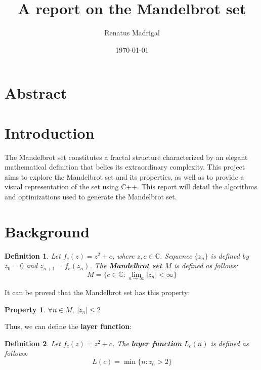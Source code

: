 \documentclass[11pt]{article}
\title{A report on the Mandelbrot set}
\author{Renatus Madrigal}
\date{\today}
\newtheorem{definition}{Definition}
\newtheorem{property}{Property}
\begin{document}
    \maketitle


    \section{Abstract}\label{sec:abstract}


    \section{Introduction}\label{sec:introduction}

    The Mandelbrot set constitutes a fractal structure characterized by an elegant mathematical definition that belies
    its extraordinary complexity.
    This project aims to explore the Mandelbrot set and its properties, as well as to provide a visual representation of
    the set using C++.
    This report will detail the algorithms and optimizations used to generate the Mandelbrot set.


    \section{Background}\label{sec:background}

    \begin{definition}
        Let $f_c(z) = z^2 + c$, where $z, c \in \mathbb{C}$.
        Sequence $\{z_n\}$ is defined by $z_0 = 0$ and $z_{n+1} = f_c(z_n)$.
        The \textbf{Mandelbrot set} $M$ is defined as follows:
        \begin{equation}
            M = \{c \in \mathbb{C} : \lim_{n \to \infty} |z_n| < \infty\}\label{eq:mandelbrot_set_define}
        \end{equation}
    \end{definition}

    It can be proved\textsuperscript{\cite{branner1989mandelbrot}} that the Mandelbrot set has this property:

    \begin{property}
        \label{prop:bounded}
        $\forall n \in M,\ |z_n| \leq 2$
    \end{property}

    Thus, we can define the \textbf{layer function}:

    \begin{definition}
        Let $f_c(z) = z^2 + c$.
        The \textbf{layer function} $L_c(n)$ is defined as follows:
        \begin{equation}
            L(c) = \min\{n : z_n > 2\}\label{eq:layer_function}
        \end{equation}
    \end{definition}
\end{document}

